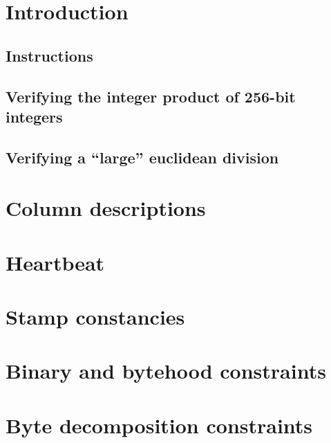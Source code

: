 \section{Introduction}                                          \label{ext: intro}
\subsection{Instructions}                                       \label{ext: intro: instructions}                          
\subsection{Verifying the integer product of 256-bit integers} \label{ext: intro: integer product of 256-bit integers}   
\subsection{Verifying a ``large'' euclidean division}          \label{ext: intro: large euclidean divisions}             
\section{Column descriptions}                                   \label{ext: columns}                                      
\section{Heartbeat}                                             \label{ext: heartbeat}                                    
\section{Stamp constancies}                                     \label{ext: constancies}                                  
\section{Binary and bytehood constraints}                       \label{ext: binary and bytehood constraints}              
\section{Byte decomposition constraints}                        \label{ext: byte decompositions}                          
